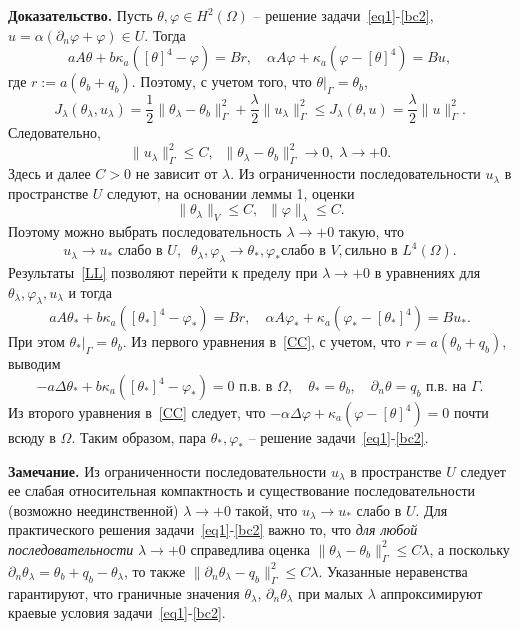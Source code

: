         \textbf{Доказательство.}
Пусть $\theta,\varphi\in H^2(\Omega)$ -- решение задачи~\eqref{eq1}-\eqref{bc2},
$u=\alpha(\partial_n\varphi+\varphi)\in U.$ Тогда
\[
    a A \theta + b \kappa_a ([\theta]^4 - \varphi ) = Br,\quad
    \alpha A \varphi + \kappa_a (\varphi - [\theta]^4)  = Bu,
\]
где $r:=a(\theta_b+q_b).$ Поэтому, с учетом того, что $\theta|_\Gamma=\theta_b$,
\[
    J_\lambda(\theta_\lambda, u_\lambda) = \frac{1}{2}\|\theta_\lambda -\theta_b\|^2_\Gamma
    + \frac{\lambda}{2}\|u_\lambda\|^2_\Gamma\leq J_\lambda(\theta, u)=\frac{\lambda}{2}\|u\|^2_\Gamma.
\]
Следовательно,
\[
    \|u_\lambda\|^2_\Gamma\leq C,\;\; \|\theta_\lambda -\theta_b\|^2_\Gamma\to 0,\; \lambda\to +0.
\]
Здесь и далее $C>0$ не зависит от $\lambda.$
Из ограниченности последовательности $u_\lambda$ в пространстве $U$ следуют, на основании
леммы 1, оценки
\[
    \|\theta_\lambda\|_V \leq C,\;\;
    \|\varphi\|_\lambda \leq C.
\]
Поэтому можно выбрать последовательность $\lambda\to+0$ такую, что
\begin{equation}
    \label{LL}
    u_\lambda \rightarrow u_* \text{  слабо в } U, \;\;
    \theta_\lambda, \varphi_\lambda \rightarrow \theta_*,\varphi_* \text{
        слабо в } V, \text{
        сильно в } L^4(\Omega).
\end{equation}
Результаты~\eqref{LL} позволяют перейти к пределу при $\lambda\to+0$
в уравнениях для $\theta_\lambda,\varphi_\lambda,u_\lambda$ и тогда
\begin{equation}
    \label{CC}
    a A \theta_* + b \kappa_a ([\theta_*]^4 - \varphi_* ) = Br,\quad
    \alpha A \varphi_* + \kappa_a (\varphi_* - [\theta_*]^4)  = Bu_*.
\end{equation}
При этом $\theta_*|_\Gamma=\theta_b.$
Из первого уравнения в~\eqref{CC}, с учетом, что $r=a(\theta_b+q_b)$,
выводим
\[
    - a\Delta\theta_* + b\kappa_a([\theta_*]^4- \varphi_*)=0 \text{ п.в. в }\Omega,
    \quad \theta_*=\theta_b,\quad \partial_n\theta = q_b \text{ п.в. на  }\Gamma.
\]
Из второго уравнения в~\eqref{CC} следует, что $-\alpha \Delta \varphi +
\kappa_a(\varphi-[\theta]^4)=0$ почти всюду в $\Omega.$ Таким образом,
пара $\theta_*,\varphi_*$ -- решение задачи~\eqref{eq1}-\eqref{bc2}.

\textbf{Замечание.} Из ограниченности последовательности $u_\lambda$ в пространстве $U$ следует
ее слабая относительная компактность и существование последовательности (возможно неединственной) $\lambda\to+0$ такой, что
$u_\lambda \rightarrow u_*$ слабо в $U$.
Для практического решения задачи~\eqref{eq1}-\eqref{bc2} важно то, что \textit{для любой последовательности}
$\lambda\to+0$ справедлива оценка
$\|\theta_\lambda -\theta_b\|^2_\Gamma\leq C\lambda$, а поскольку $\partial_n\theta_\lambda=\theta_b+q_b-\theta_\lambda$, то также $\|\partial_n\theta_\lambda-q_b\|^2_\Gamma\leq C\lambda$.
Указанные неравенства гарантируют, что граничные значения $\theta_\lambda,\,\partial_n\theta_\lambda$
при малых $\lambda$
аппроксимируют краевые условия задачи~\eqref{eq1}-\eqref{bc2}.

